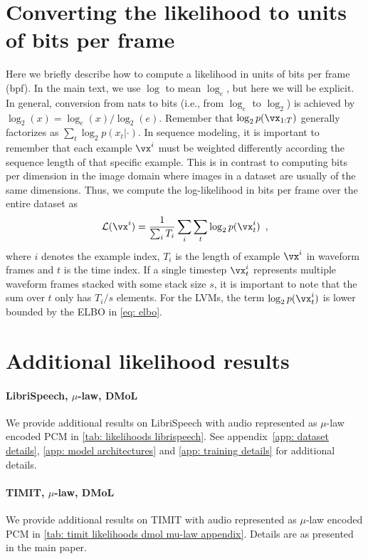 {\section{Converting the likelihood to units of bits per frame}\label{app: likelihood in bits per frame}
Here we briefly describe how to compute a likelihood in units of bits per frame (bpf). In the main text, we use $\log$ to mean $\log_e$, but here we will be explicit. In general, conversion from nats to bits (i.e., from $\log_e$ to $\log_2$) is achieved by $\log_2(x) = \log_e(x)  / \log_2(e) $. Remember that $\log_2 p(\vx_{1:T})$ generally factorizes as $\sum_t \log_2 p(x_t|\cdot)$. In sequence modeling, it is important to remember that each example $\vx^{i}$ must be weighted differently according the sequence length of that specific example. This is in contrast to computing bits per dimension in the image domain where images in a dataset are usually of the same dimensions. Thus, we compute the log-likelihood in bits per frame over the entire dataset as
\begin{equation}
    \mathcal{L}(\vx^{i}) = \frac{1}{\sum_i T_i} \sum_i \sum_t \log_2 p(\vx_t^{i}) \enspace ,
\end{equation}
where $i$ denotes the example index, $T_i$ is the length of example $\vx^i$ in waveform frames and $t$ is the time index. If a single timestep $\vx_t^i$ represents multiple waveform frames stacked with some stack size $s$, it is important to note that the sum over $t$ only has $T_i/s$ elements. 
For the LVMs, the term $\log_2 p(\vx_t^{i})$ is lower bounded by the ELBO in \eqref{eq: elbo}. 


\section{Additional likelihood results} \label{app: additional likelihood results appendix}

\paragraph{LibriSpeech, $\mu$-law, DMoL} We provide additional results on LibriSpeech with audio represented as $\mu$-law encoded PCM in \cref{tab: likelihoods librispeech}. See appendix~\cref{app: dataset details}, \cref{app: model architectures} and \cref{app: training details} for additional details.

\paragraph{TIMIT, $\mu$-law, DMoL} We provide additional results on TIMIT with audio represented as $\mu$-law encoded PCM in \cref{tab: timit likelihoods dmol mu-law appendix}. Details are as presented in the main paper.

}
